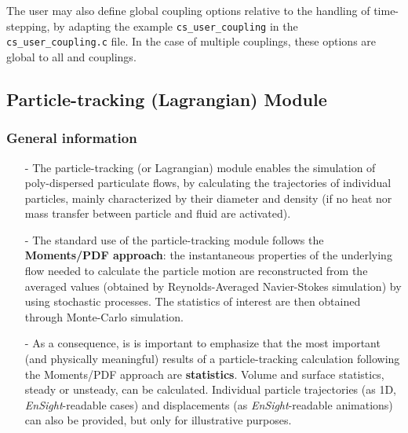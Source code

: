 The user may also define global coupling options relative to the handling of
time-stepping, by adapting the example \texttt{cs\_user\_coupling}
in the \texttt{cs\_user\_coupling.c} file. In the case of multiple couplings,
these options are global to all \syrthes and \CS couplings.

\subsection{Particle-tracking (Lagrangian) Module}

\subsubsection{General information}\label{sec:over-lag}

\begin{itemize}

\item[-] The particle-tracking (or Lagrangian) module enables the simulation of poly-dispersed particulate flows, by calculating the trajectories of individual particles, mainly characterized by their diameter and density (if no heat nor mass transfer between particle and fluid are activated).

\item[-] The standard use of the particle-tracking module follows the \textbf{Moments/PDF approach}: the instantaneous properties of the underlying flow needed to calculate the particle motion are reconstructed from the averaged values (obtained by Reynolds-Averaged Navier-Stokes simulation) by using stochastic processes. The statistics of interest are then obtained through Monte-Carlo simulation.

\item[-] As a consequence, is is important to emphasize that the most important (and physically meaningful) results of a particle-tracking calculation following the Moments/PDF approach are \mbox{\textbf{statistics}}. Volume and surface statistics, steady or unsteady, can be calculated. Individual particle trajectories (as 1D, \textit{EnSight}-readable cases) and displacements (as \textit{EnSight}-readable animations) can also be provided, but only for illustrative purposes.

\end{itemize}

